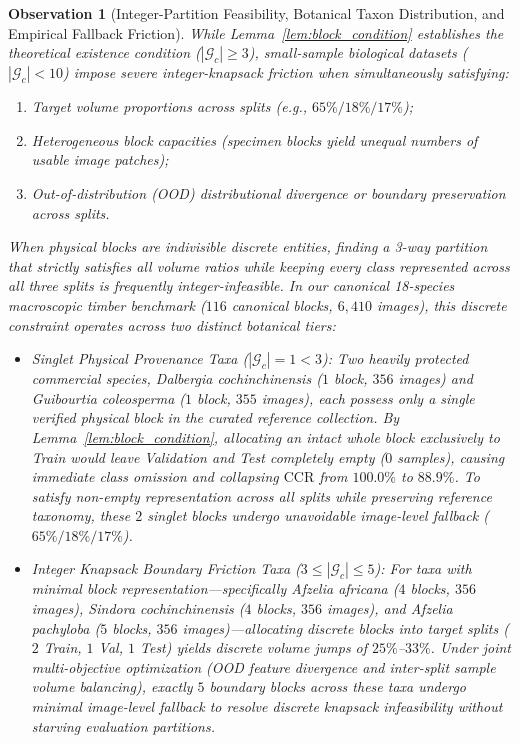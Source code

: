 \documentclass[a4paper,fleqn]{cas-sc}
\newtheorem{observation}{Observation}
\begin{document}
\begin{observation}[Integer-Partition Feasibility, Botanical Taxon Distribution, and Empirical Fallback Friction]
\label{obs:trilemma}
While Lemma~\ref{lem:block_condition} establishes the theoretical existence condition ($|\mathcal{G}_c| \ge 3$), small-sample biological datasets ($|\mathcal{G}_c| < 10$) impose severe integer-knapsack friction when simultaneously satisfying:
\begin{enumerate}
\item[(a)] Target volume proportions across splits (e.g., $65\%/18\%/17\%$);
\item[(b)] Heterogeneous block capacities (specimen blocks yield unequal numbers of usable image patches);
\item[(c)] Out-of-distribution (OOD) distributional divergence or boundary preservation across splits.
\end{enumerate}
When physical blocks are indivisible discrete entities, finding a 3-way partition that strictly satisfies all volume ratios while keeping every class represented across all three splits is frequently integer-infeasible. In our canonical 18-species macroscopic timber benchmark ($116$ canonical blocks, $6{,}410$ images), this discrete constraint operates across two distinct botanical tiers:
\begin{itemize}
\item \emph{Singlet Physical Provenance Taxa ($|\mathcal{G}_c| = 1 < 3$)}: Two heavily protected commercial species, \textit{Dalbergia cochinchinensis} ($1$ block, $356$ images) and \textit{Guibourtia coleosperma} ($1$ block, $355$ images), each possess only a single verified physical block in the curated reference collection. By Lemma~\ref{lem:block_condition}, allocating an intact whole block exclusively to Train would leave Validation and Test completely empty ($0$ samples), causing immediate class omission and collapsing $\mathrm{CCR}$ from $100.0\%$ to $88.9\%$. To satisfy non-empty representation across all splits while preserving reference taxonomy, these $2$ singlet blocks undergo unavoidable image-level fallback ($65\%/18\%/17\%$).
\item \emph{Integer Knapsack Boundary Friction Taxa ($3 \le |\mathcal{G}_c| \le 5$)}: For taxa with minimal block representation—specifically \textit{Afzelia africana} ($4$ blocks, $356$ images), \textit{Sindora cochinchinensis} ($4$ blocks, $356$ images), and \textit{Afzelia pachyloba} ($5$ blocks, $356$ images)—allocating discrete blocks into target splits ($2$ Train, $1$ Val, $1$ Test) yields discrete volume jumps of $25\%$--$33\%$. Under joint multi-objective optimization (OOD feature divergence and inter-split sample volume balancing), exactly $5$ boundary blocks across these taxa undergo minimal image-level fallback to resolve discrete knapsack infeasibility without starving evaluation partitions.

\end{itemize}
\end{observation}
\end{document}
